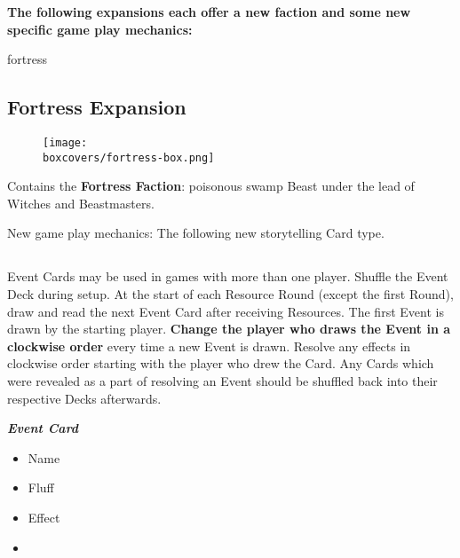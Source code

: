 \textbf{The following expansions each offer a new faction and some new specific game play mechanics:}
\begin{multicols}{2}
\begin{expansion}[title=]{fortress}
  \subsection*{\color{fortress}Fortress Expansion}
  \setlength\intextsep{0pt}
  \setlength\columnsep{0.8em}
  \begin{wrapfigure}{l}{0.35\textwidth}
      \texttt{[image: \\boxcovers/fortress-box.png]}
  \end{wrapfigure}
  Contains the \textbf{Fortress Faction}: poisonous swamp Beast under the lead of Witches and Beastmasters.\par
  \medskip
  New game play mechanics: The following new storytelling Card type.
  \medskip
  \subsection*{}
  Event Cards may be used in games with more than one player.
  Shuffle the Event Deck during setup.
  At the start of each Resource Round (except the first Round), draw and read the next Event Card after receiving Resources.
  The first Event is drawn by the starting player.
  \textbf{Change the player who draws the Event in a clockwise order} every time a new Event is drawn.
  Resolve any effects in clockwise order starting with the player who drew the Card.
  Any Cards which were revealed as a part of resolving an Event should be shuffled back into their respective Decks afterwards.

  \medskip

  \begin{minipage}[h]{\linewidth}
    \vspace{0.1pt}
    \centering
    \begin{scriptsize}
    \end{scriptsize}
    \footnotesize
    \textbf{\textit{\textcolor{darkcandyapplered}{Event Card}}}
    \begin{multicols}{2}
      \begin{itemize}
        \item[\textbf{1.}] Name
        \item[\textbf{2.}] Fluff
        \item[\textbf{3.}] Effect
        \item[\textbf{\phantom{.}}] \phantom{.}
      \end{itemize}
    \end{multicols}
  \end{minipage}
\end{expansion}


\end{multicols}
